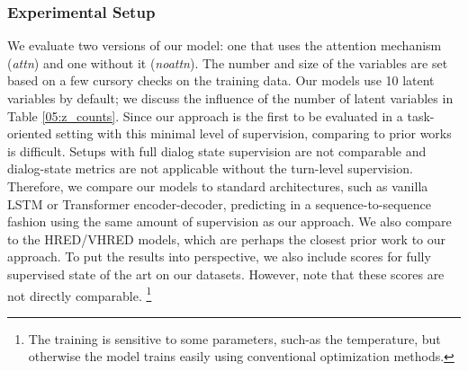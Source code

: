 \subsubsection{Experimental Setup}
\label{05:sec:expe_setup}
We evaluate two versions of our model: one that uses the attention mechanism (\emph{attn}) and one without it (\emph{noattn}). The number and size of the variables are set based on a few cursory checks on the training data. Our models use 10 latent variables by default; we discuss the influence of the number of latent variables in Table \ref{05:z_counts}.
Since our approach is the first to be evaluated in a task-oriented setting with this minimal level of supervision, comparing to prior works is difficult. Setups with full dialog state supervision are not comparable and dialog-state metrics are not applicable without the turn-level supervision. Therefore, we compare our models to standard architectures, such as vanilla LSTM or Transformer encoder-decoder, predicting in a sequence-to-sequence fashion using the same amount of supervision as our approach. We also compare to the HRED/VHRED models, which are perhaps the closest prior work to our approach. To put the results into perspective, we also include scores for fully supervised state of the art on our datasets.
However, note that these scores are not directly comparable.
\footnote{The training is sensitive to some parameters, such-as the  temperature, but otherwise the model trains easily using conventional optimization methods.}

